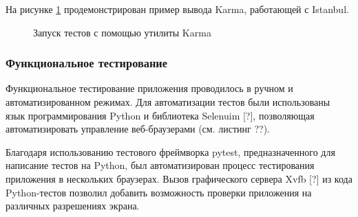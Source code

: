 {\color{gray}{*listing*}}

На рисунке \ref{fig:karma-output} продемонстрирован пример вывода Karma, работающей с Istanbul.

\begin{figure}[h!]
  \centering
  \setlength{\fboxsep}{5pt}
  \vspace*{6pt}
  \caption{Запуск тестов с помощью утилиты Karma}
  \label{fig:karma-output}
\end{figure}


\subsubsection{Функциональное тестирование}

Функциональное тестирование приложения проводилось в ручном и автоматизированном режимах. Для автоматизации тестов были использованы язык программирования Python и библиотека Selenuim [?], позволяющая автоматизировать управление веб-браузерами (см. листинг ??).

Благодаря использованию тестового фреймворка pytest, предназначенного для написание тестов на Python, был автоматизирован процесс тестирования приложения в нескольких браузерах. Вызов графического сервера Xvfb [?] из кода Python-тестов позволил добавить возможность проверки приложения на различных разрешениях экрана.

{\color{gray}{*listing*}}




